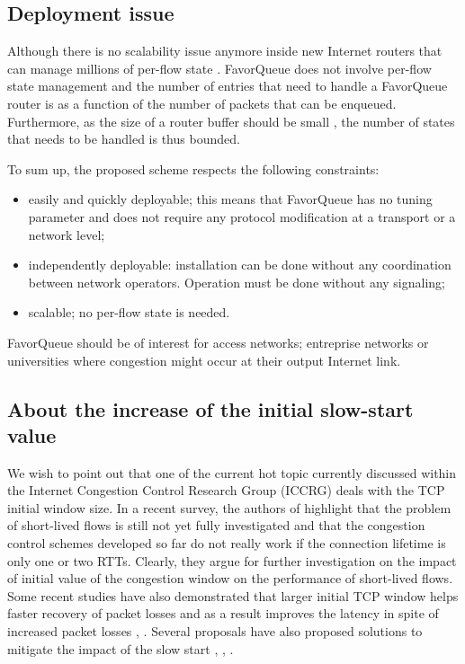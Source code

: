 \documentclass{elsart}
\begin{document}
\subsection{Deployment issue}

Although there is no scalability issue anymore inside new Internet routers that can manage millions of per-flow state \cite{roberts09}. FavorQueue does not involve per-flow state management and the number of entries
that need to handle a FavorQueue router is as a function of the number of packets that can be enqueued. Furthermore, as the size of a router buffer should be small \cite{Ganjali06}, the number of states that needs to be handled is thus bounded.

To sum up, the proposed scheme respects the following constraints:
\begin{itemize}
\item easily and quickly deployable; this means that FavorQueue has no tuning parameter and does not require any protocol modification at a transport or a network level;
\item independently deployable: installation can be done without any coordination  between network operators. Operation must be done without any signaling;
\item scalable; no per-flow state is needed.
\end{itemize}

FavorQueue should be of interest for access networks; entreprise networks or universities where congestion might occur at their output Internet link.  

\subsection{About the increase of the initial slow-start value}

We wish to point out that one of the current hot topic currently discussed within the Internet Congestion Control Research Group (ICCRG) deals with the TCP initial window size. 
In a recent survey, the authors of \cite{survey10cc} highlight that the problem of short-lived flows is still not yet fully investigated and that the congestion control schemes
developed so far do not really work if the connection lifetime is only one or two RTTs. Clearly, they argue for further investigation on the impact of initial value of the congestion window on the performance of short-lived flows.
Some recent studies have also demonstrated that larger initial TCP window helps faster recovery of packet losses and as a result improves the latency in spite of increased packet losses \cite{dukkipati10}, \cite{scharf09}. 
Several proposals have also proposed solutions to mitigate the impact of the slow start \cite{rfc4782}, \cite{jumpstart}, \cite{scharf08}. 
\end{document}

